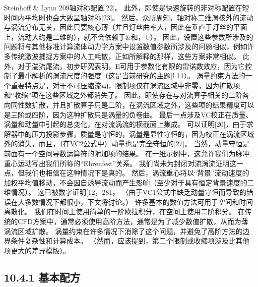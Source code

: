\documentclass[UTF8,11pt,a4paper,openany,fontset=fandol]{ctexbook}
\begin{document}
Steinhoff \& Lynn 209轴对称配置[22]。 此外，即使是快速旋转的非对称配置在短时间内平均时也会大致呈轴对称[23]。 然后，众所周知，轴对称二维涡核外的流动与涡流分布无关，因此只要核心薄（并且灯丝曲率大，因此在垂直于灯丝的平面上，流动大约是二维的），就不会依赖于\&和，U）。 因此，设置这些参数所涉及的问题将与其他标准计算流体动力学方案中设置数值参数所涉及的问题相似，例如许多传统激波捕捉方案中的人工耗散，正如所解释的那样，这些方案非常相似。 此外，对于湍流尾流，初步研究表明，E可用于参数化有限的雷诺数效应，因为它控制了最小解析的涡流尺度的强度（这是当前研究的主题[l 11）。 涡量约束方法的一个重要特点是，对于不可压缩流动，限制项仅在涡流区域中非零，因为扩散项和“收缩”项在这些区域之外都消失了。 因此，即使存在与对流算子相关的二阶各向同性数扩散，并且扩散算子只是二阶，在涡流区域之外，这些项的结果精度可以是三阶或四阶，因为这种扩散只是涡量的负卷曲。 最后一点涉及VC校正在质量、涡量和动量中引起的总变化，在对流涡流的横截面上集成。 可以证明[20]，由于求解器中的压力投影步骤，质量是守恒的，涡量是显性守恒的，因为校正在涡流区域外的消失，而且，（在VC2公式中）动量也是完全守恒的[27]。 当然，动量守恒是前面有一个空间导数运算符的附加项的结果。 在一维示例中，这允许我们为脉冲重心运动写出我们所称的“Ehrenfest”关系。 我们尚未为封闭对流涡流证明这一点，但我们也相信在这种情况下是真的。 然后，涡流重心将以“背景”流动速度的加权平均值移动，不会因自诱导流动而产生影响（至少对于具有恒定背景速度的二维情况）。 这已被数字证明[12，281。 （由于VC1公式中缺乏动量守恒而导致的错误在大多数情况下都很小，下文将讨论。） 许多基本的数值方法可用于空间和时间离散化。 我们在时间上使用简单的一阶欧拉积分，在空间上使用二阶积分。 在传统的CFD方案中，通常必须使用高阶方法，通常是为了减少数值扩散，从而为薄涡流区域扩散。 涡量约束在许多情况下消除了这个问题，并避免了高阶方法的边界条件复杂性和计算成本。 （然而，应该提到，第二个限制或收缩项涉及比其他项更大的差异模版）。

\subsection{10.4.1 基本配方}
\end{document}
